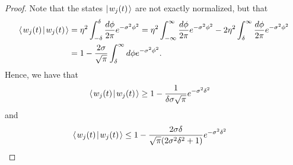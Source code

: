 \documentclass[../thesis-main/thesis-main]{subfiles}
\begin{document}
\begin{proof}
Note that the states $|\mspace{2mu} w_j(t) \mspace{2mu} \rangle$ are not exactly normalized, but that 
\begin{align}
  \langle\mspace{2mu} w_j(t) \mspace{2mu} | \mspace{2mu} w_j(t)\mspace{2mu} \rangle &= \eta^2  \int_{-\delta}^\delta \frac{d\phi}{2\pi}  e^{-\sigma^2\phi^2} =  \eta^2  \int_{-\infty}^\infty \frac{d\phi}{2\pi}  e^{-\sigma^2\phi^2} - 2 \eta^2 \int_{\delta}^\infty \frac{d\phi}{2\pi} e^{-\sigma^2 \phi^2} \\
  &= 1 - \frac{2 \sigma}{\sqrt{\pi}} \int_{\delta}^\infty d\phi e^{-\sigma^2\phi^2}.
\end{align}
Hence, we have that
\begin{align}
  \langle\mspace{2mu} w_j(t) \mspace{2mu} | \mspace{2mu} w_j(t)\mspace{2mu} \rangle & \geq 1 - \frac{1}{\delta \sigma \sqrt{\pi}} e^{-\sigma^2\delta^2}
\end{align}
and
\begin{align}
  \langle\mspace{2mu} w_j(t) \mspace{2mu} | \mspace{2mu} w_j(t)\mspace{2mu} \rangle & \leq 1 - \frac{ 2\sigma \delta}{\sqrt{\pi}(2 \sigma^2 \delta^2 + 1)}e^{- \sigma^2 \delta^2}
\end{align}


\begin{comment}

In particular, we can use the bound of \eq{h_bound} to see
\begin{align}
  \eta^{-2} 
  &\leq 2  \sigma^2\int_{0}^\delta d\phi \Big[ h_{\infty}^{1/(2\pi\sigma)} \big(2 \pi i \phi \sigma^2\big)\Big]^2\\
  &\leq 2\sigma^2 \int_{0}^\delta d\phi \Bigg(1 + 2 \Bigg[ \frac{ 1 + (1 - 2\pi \phi \sigma^2) \frac{1}{4\pi^2\sigma^2}}{1 - \frac{1}{4\pi^2 \sigma^2} (2\pi\phi\sigma^2)}\Bigg]e^{-\frac{(2\pi\sigma)^2}{2} + 2\pi \phi\sigma^2}\Bigg)^2\\
  & = 2 \sigma^2 \int_{0}^\delta d\phi \Bigg( 1 + 2 \Bigg[ 1 + \frac{1}{2\pi \sigma^2}\frac{1}{2\pi- \phi}\Bigg] e^{2\pi \sigma^2 (\phi - \pi)}\Bigg)^2\\
  & < 2 \sigma^2 \delta\Bigg( 1 + 2 \Bigg[ 1 + \frac{1}{2\pi \sigma^2}\frac{1}{2\pi - \delta}\Bigg] e^{2\pi \sigma^2 (\delta - \pi)}\Bigg)^2
\end{align}
and if $\delta < \pi/2$, we find that
\begin{equation}
  \eta^{-2}  < 2 \sigma^2 \delta \big( 1 + 4 e^{-\pi^2 \sigma^2}\big).
\end{equation}
If we then note that for purely imaginary $\theta$, $h_L^\sigma(\theta) < h_{L+1}^\sigma(\theta)$ as the additional terms are always positive, and that $h_0^\sigma(\theta) = 1$, we can also bound this value by
\begin{equation}
  \eta^{-2} > 2 \sigma^2 \int_{0}^\delta d \phi e^{ - \sigma^2 \phi^2}
   > 2\sigma^2 \int_{0}^\delta d\phi e^{-\sigma^2\delta^2}= 2 \sigma^2 \delta e^{-\sigma^2\delta^2}
\end{equation}


\end{comment}
\end{proof}
\end{document}
